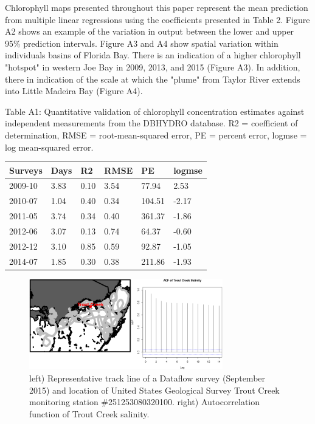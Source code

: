 Chlorophyll maps presented throughout this paper represent the mean prediction from multiple linear regressions using the coefficients presented in Table 2. Figure A2 shows an example of the variation in output between the lower and upper 95\% prediction intervals. Figure A3 and A4 show spatial variation within individuals basins of Florida Bay. There is an indication of a higher chlorophyll "hotspot" in western Joe Bay in 2009, 2013, and 2015 (Figure A3). In addition, there in indication of the scale at which the "plume" from Taylor River extends into Little Madeira Bay (Figure A4).

\newpage

Table A1: Quantitative validation of chlorophyll concentration estimates against independent measurements from the DBHYDRO database. R2 = coefficient of determination, RMSE  = root-mean-squared error, PE = percent error, logmse = log mean-squared error.

\begin{longtable}[c]{@{}llllll@{}}
\toprule
Surveys & Days & R2 & RMSE & PE & logmse\tabularnewline
\midrule
\endhead
2009-10 & 3.83 & 0.10 & 3.54 & 77.94 & 2.53\tabularnewline
2010-07 & 1.04 & 0.40 & 0.34 & 104.51 & -2.17\tabularnewline
2011-05 & 3.74 & 0.34 & 0.40 & 361.37 & -1.86\tabularnewline
2012-06 & 3.07 & 0.13 & 0.74 & 64.37 & -0.60\tabularnewline
2012-12 & 3.10 & 0.85 & 0.59 & 92.87 & -1.05\tabularnewline
2014-07 & 1.85 & 0.30 & 0.38 & 211.86 & -1.93\tabularnewline
\bottomrule
\end{longtable}

\newpage

\begin{figure}
  \centering
  \includegraphics[width=0.75\textwidth]{../../figures/trout.png}
  \caption{left) Representative track line of a Dataflow survey (September 2015) and location of United States Geological Survey Trout Creek monitoring station \#251253080320100. right) Autocorrelation function of Trout Creek salinity.}
  \label{fig:a1}
\end{figure}

